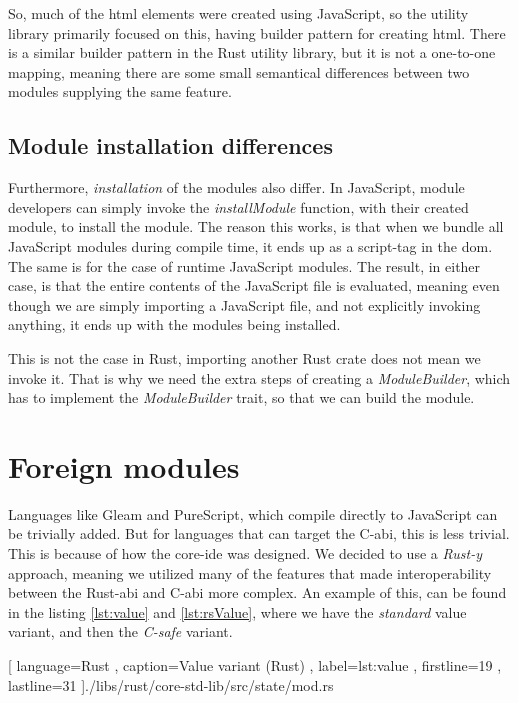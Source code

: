 So, much of the \gls*{html} elements were created using JavaScript, so the
utility library primarily focused on this, having builder pattern for creating
\gls*{html}. There is a similar builder pattern in the Rust utility library, but
it is not a one-to-one mapping, meaning there are some small semantical
differences between two modules supplying the same feature.


\subsection{Module installation differences}

Furthermore, \textit{installation} of the modules also differ. In JavaScript,
module developers can simply invoke the \textit{installModule} function, with
their created module, to install the module. The reason this works, is that when
we bundle all JavaScript modules during compile time, it ends up as a script-tag
in the \gls*{dom}. The same is for the case of runtime JavaScript modules.
The result, in either case, is that the entire contents of the JavaScript file
is evaluated, meaning even though we are simply importing a JavaScript file, and
not explicitly invoking anything, it ends up with the modules being installed.

This is not the case in Rust, importing another Rust crate does not mean we
invoke it. That is why we need the extra steps of creating a
\textit{ModuleBuilder}, which has to implement the \textit{ModuleBuilder} trait,
so that we can build the module.


\section{Foreign modules} \label{sec:fm}

Languages like Gleam and PureScript, which compile directly to JavaScript can
be trivially added. But for languages that can target the C-\gls*{abi}, this is
less trivial. This is because of how the core-\gls*{ide} was designed. We decided
to use a \textit{Rust-y} approach, meaning we utilized many of the features that
made interoperability between the Rust-\gls*{abi} and C-\gls*{abi} more complex.
An example of this, can be found in the listing \ref{lst:value} and
\ref{lst:rsValue}, where we have the \textit{standard} value variant, and then
the \textit{C-safe} variant.

\begin{code}[H]
  
    [ language=Rust
    , caption={Value variant (Rust)}
    , label=lst:value
    , firstline=19
    , lastline=31
    ]{./libs/rust/core-std-lib/src/state/mod.rs}
\end{code}

